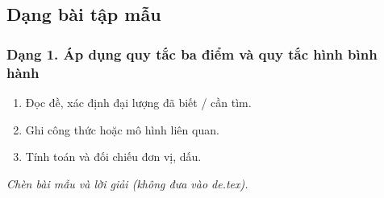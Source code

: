 

\subsection{Dạng bài tập mẫu}
\subsubsection{Dạng 1. Áp dụng quy tắc ba điểm và quy tắc hình bình hành}
\begin{phuongphap}
\begin{enumerate}
\item Đọc đề, xác định đại lượng đã biết / cần tìm.
\item Ghi công thức hoặc mô hình liên quan.
\item Tính toán và đối chiếu đơn vị, dấu.
\end{enumerate}
\end{phuongphap}
\begin{vidumau}
\textit{Chèn bài mẫu và lời giải (không đưa vào de.tex).}
\end{vidumau}


